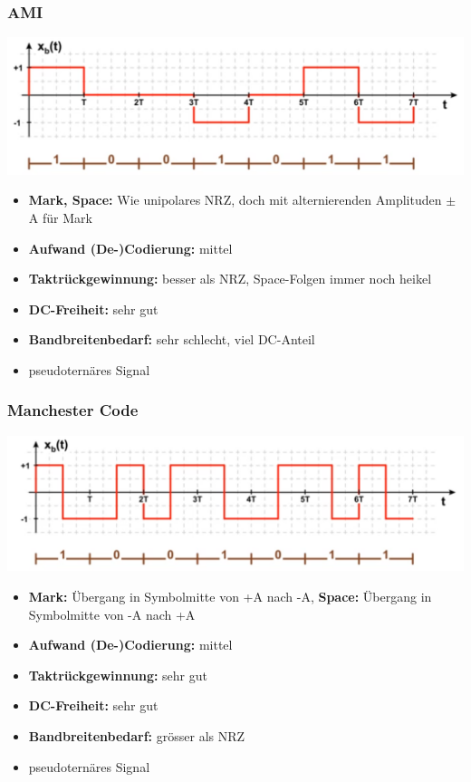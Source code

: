 \subsubsection{AMI}
\begin{center}
	\includegraphics[width=0.6\columnwidth]{Images/ami}
\end{center}
\begin{itemize}[nosep]
	\item \textbf{Mark, Space:} Wie unipolares NRZ, doch mit alternierenden Amplituden $\pm$A für Mark
	\item \textbf{Aufwand (De-)Codierung:} mittel
	\item \textbf{Taktrückgewinnung:} besser als NRZ, Space-Folgen immer noch heikel
	\item \textbf{DC-Freiheit:} sehr gut
	\item \textbf{Bandbreitenbedarf:} sehr schlecht, viel DC-Anteil
	\item pseudoternäres Signal
\end{itemize}

\subsubsection{Manchester Code}
\begin{center}
	\includegraphics[width=0.6\columnwidth]{Images/manchester}
\end{center}
\begin{itemize}[nosep]
	\item \textbf{Mark:} Übergang in Symbolmitte von +A nach -A, \textbf{Space:} Übergang in Symbolmitte von -A nach +A
	\item \textbf{Aufwand (De-)Codierung:} mittel
	\item \textbf{Taktrückgewinnung:} sehr gut
	\item \textbf{DC-Freiheit:} sehr gut
	\item \textbf{Bandbreitenbedarf:} grösser als NRZ
	\item pseudoternäres Signal
\end{itemize}

